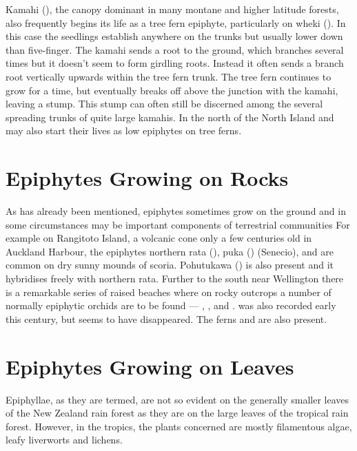 Kamahi (), the canopy dominant in many montane and higher latitude forests, also frequently begins its life as a tree fern epiphyte, particularly on wheki ().
In this case the seedlings establish anywhere on the trunks but usually lower down than five-finger.
The kamahi sends a root to the ground, which branches several times but it doesn't seem to form girdling roots.
Instead it often sends a branch root vertically upwards within the tree fern trunk.
The tree fern continues to grow for a time, but eventually breaks off above the junction with the kamahi, leaving a stump.
This stump can often still be discerned among the several spreading trunks of quite large kamahis.
In the north of the North Island  and  may also start their lives as low epiphytes on tree ferns.

\section{Epiphytes Growing on Rocks}

As has already been mentioned, epiphytes sometimes grow on the ground and in some circumstances may be important components of terrestrial communities For example on Rangitoto Island, a volcanic cone only a few centuries old in Auckland Harbour, the epiphytes northern rata (), puka () (Senecio),   and  are common on dry sunny mounds of scoria.
Pohutukawa () is also present and it hybridises freely with northern rata.
Further to the south near Wellington there is a remarkable series of raised beaches where on rocky outcrops a number of normally epiphytic orchids are to be found --- , , and .  was also recorded early this century, but seems to have disappeared.
The ferns  and  are also present.

\section{Epiphytes Growing on Leaves}

Epiphyllae, as they are termed, are not so evident on the generally smaller leaves of the New Zealand rain forest as they are on the large leaves of the tropical rain forest.
However, in the tropics, the plants concerned are mostly filamentous algae, leafy liverworts and lichens.

